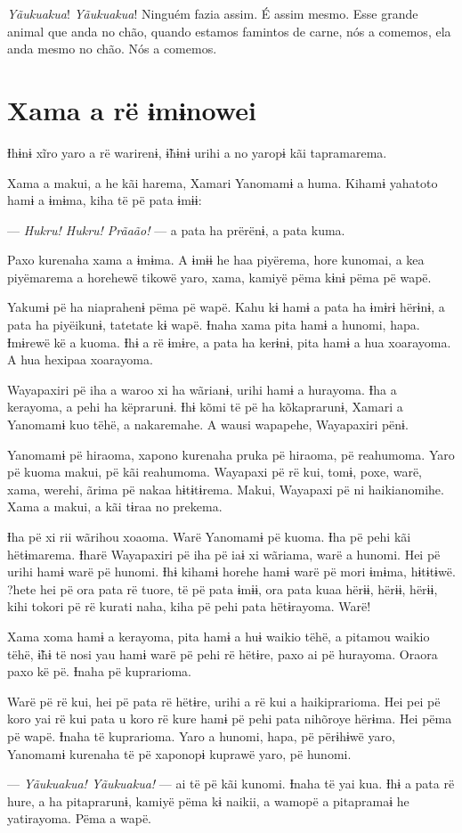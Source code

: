\textit{Yãukuakua}! \textit{Yãukuakua}! Ninguém fazia assim. É assim mesmo. Esse
grande animal que anda no chão, quando estamos famintos de carne, nós a
comemos, ela anda mesmo no chão. Nós a comemos. 

\chapter{Xama a rë ɨmɨnowei}
 
Ɨhɨnɨ xĩro yaro a rë warirenɨ, ɨ̃hɨnɨ urihi a no yaropɨ kãi tapramarema. 

Xama a makui, a he kãi harema, Xamari Yanomamɨ a huma. Kihamɨ yahatoto
hamɨ a ɨmɨma, kiha të pë pata ɨmɨɨ: 

--- \textit{Hukru! Hukru! Prãaão!} --- a pata ha prërënɨ, a pata kuma. 

Paxo kurenaha xama a ɨmɨma. A ɨmɨɨ he haa piyërema, hore kunomai, a kea
piyëmarema a horehewë tikowë yaro, xama, kamiyë pëma kɨnɨ pëma pë wapë. 

Yakumɨ pë ha niaprahenɨ pëma pë wapë. Kahu kɨ hamɨ a pata ha ɨmɨrɨ
hërɨnɨ, a pata ha piyëikunɨ, tatetate kɨ wapë. Ɨnaha xama pita hamɨ a
hunomi, hapa. Ɨmɨrewë kë a kuoma. Ɨhɨ a rë ɨmɨre, a pata ha kerɨnɨ, pita
hamɨ a hua xoarayoma. A hua hexipaa xoarayoma. 

Wayapaxiri pë iha a waroo xi ha wãrianɨ, urihi hamɨ a hurayoma. Ɨha a
kerayoma, a pehi ha këprarunɨ. Ɨhɨ kõmi të pë ha kõkaprarunɨ, Xamari a
Yanomamɨ kuo tëhë, a nakaremahe. A wausi wapapehe, Wayapaxiri pënɨ.

 Yanomamɨ pë hiraoma, xapono kurenaha pruka pë hiraoma, pë reahumoma.
Yaro pë kuoma makui, pë kãi reahumoma. Wayapaxi pë rë kui, tomɨ, poxe,
warë, xama, werehi, ãrima pë nakaa hɨtɨtɨrema. Makui, Wayapaxi pë ni
haikianomihe. Xama a makui, a kãi tɨraa no prekema. 

Ɨha pë xi rii wãrihou xoaoma. Warë Yanomamɨ pë kuoma. Ɨha pë pehi kãi
hëtɨmarema. Ɨharë Wayapaxiri pë iha pë iaɨ xi wãriama, warë a hunomi.
Hei pë urihi hamɨ warë pë hunomi. Ɨhɨ kihamɨ horehe hamɨ warë pë mori
ɨmɨma, hɨtɨtɨwë. ?hete hei pë ora pata rë tuore, të pë pata ɨmɨɨ, ora
pata kuaa hërɨɨ, hërɨɨ, hërɨɨ, kihi tokori pë rë kurati naha, kiha pë
pehi pata hëtɨrayoma. Warë! 

Xama xoma hamɨ a kerayoma, pita hamɨ a huɨ waikio tëhë, a pitamou waikio
tëhë, ɨ̃hɨ të nosi yau hamɨ warë pë pehi rë hëtɨre, paxo ai pë hurayoma.
Oraora paxo kë pë. Ɨnaha pë kuprarioma. 

Warë pë rë kui, hei pë pata rë hëtɨre, urihi a rë kui a haikiprarioma.
Hei pei pë koro yai rë kui pata u koro rë kure hamɨ pë pehi pata
nihõroye hërɨma. Hei pëma pë wapë. Ɨnaha të kuprarioma. Yaro a hunomi,
hapa, pë përɨhɨwë yaro, Yanomamɨ kurenaha të pë xaponopɨ kuprawë yaro,
pë hunomi. 

--- \textit{Yãukuakua! Yãukuakua!} --- ai të pë kãi kunomi. Ɨnaha të yai kua. Ɨhɨ a
pata rë hure, a ha pitaprarunɨ, kamiyë pëma kɨ naikii, a wamopë a
pitapramaɨ he yatirayoma. Pëma a wapë. 